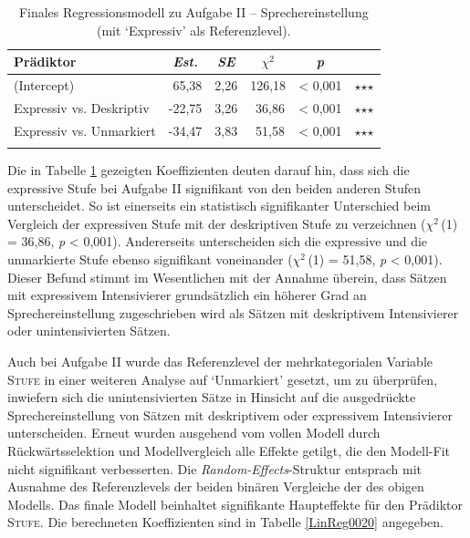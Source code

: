 %
\begin{table}
\begin{tabularx}{\textwidth}{Xccccr}
\lsptoprule
Prädiktor & \textit{Est.} & \textit{SE} & \textit{$\chi$$^{2}$} & \textit{p} & \\
\midrule
(Intercept) & \textcolor{white}{-}65,38 & 2,26 & 126,18 & < 0,001 & $\star$$\star$$\star$\\
Expressiv vs. Deskriptiv & -22,75 & 3,26 & \textcolor{white}{-}36,86 & < 0,001 & $\star$$\star$$\star$ \\
Expressiv vs. Unmarkiert & -34,47 & 3,83 & \textcolor{white}{-}51,58 & < 0,001 & $\star$$\star$$\star$\\
\lspbottomrule
\end{tabularx}
\caption[Finales Regressionsmodell zu Aufgabe II von Experiment 1 (mit `Expressiv' als Referenzlevel)]{Finales Regressionsmodell zu Aufgabe II -- Sprechereinstellung (mit `Expressiv' als Referenzlevel).}
\label{LinReg0002}
\end{table}

\noindent Die in Tabelle \ref{LinReg0002} gezeigten Koeffizienten deuten darauf hin, dass sich die expressive Stufe bei Aufgabe II signifikant von den beiden anderen Stufen unterscheidet. So ist einerseits ein statistisch signifikanter Unterschied beim Vergleich der expressiven Stufe mit der deskriptiven Stufe zu verzeichnen ({$\chi$$^{2}$\,(1) = 36,86}, \textit{p} < 0,001). Andererseits unterscheiden sich die expressive und die unmarkierte Stufe ebenso signifikant voneinander ($\chi$$^{2}$\,(1) = 51,58, {\textit{p} < 0,001}). Dieser Befund stimmt im Wesentlichen mit der Annahme überein, dass Sätzen mit expressivem Intensivierer grundsätzlich ein höherer Grad an Sprechereinstellung zugeschrieben wird als Sätzen mit deskriptivem Intensivierer oder unintensivierten Sätzen.


Auch bei Aufgabe II wurde das Referenzlevel der mehrkategorialen Variable \textsc{Stufe} in einer weiteren Analyse auf `Unmarkiert' gesetzt, um zu überprüfen, inwiefern sich die unintensivierten Sätze in Hinsicht auf die ausgedrückte Sprechereinstellung von Sätzen mit deskriptivem oder expressivem Intensivierer unterscheiden. Erneut wurden ausgehend vom vollen Modell durch Rückwärtsselektion und Modellvergleich alle Effekte getilgt, die den Modell-Fit nicht signifikant verbesserten. Die \textit{Random-Effects}-Struktur entsprach mit Ausnahme des Referenzlevels der beiden binären Vergleiche der des obigen Modells. Das finale Modell beinhaltet signifikante Haupteffekte für den Prädiktor \textsc{Stufe}. Die berechneten Koeffizienten sind in {Tabelle \ref{LinReg0020} angegeben}.


